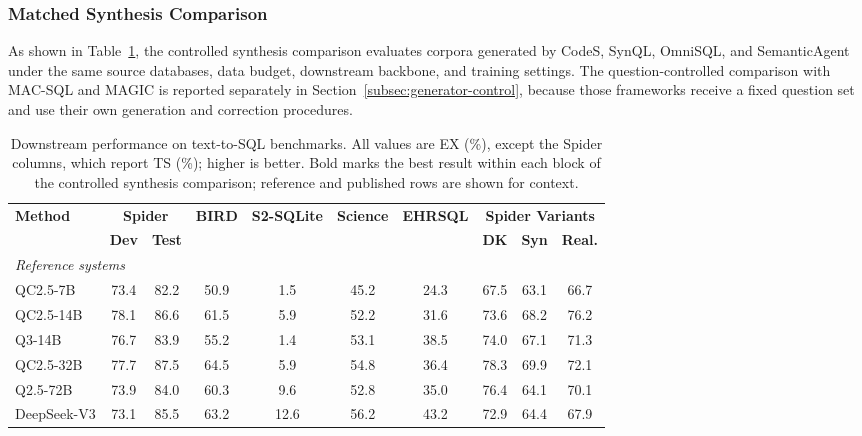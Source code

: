 \documentclass[letterpaper,journal]{IEEEtran}
\begin{document}
\subsubsection{Matched Synthesis Comparison}
\label{subsec:matched-comparison}

As shown in Table~\ref{tab:main_results}, the controlled synthesis comparison evaluates corpora generated by CodeS, SynQL, OmniSQL, and SemanticAgent under the same source databases, data budget, downstream backbone, and training settings. The question-controlled comparison with MAC-SQL and MAGIC is reported separately in Section~\ref{subsec:generator-control}, because those frameworks receive a fixed question set and use their own generation and correction procedures.
\begin{table}[t]
\centering
\caption{Downstream performance on text-to-SQL benchmarks. All values are EX (\%), except the Spider columns, which report TS (\%); higher is better. Bold marks the best result within each block of the controlled synthesis comparison; reference and published rows are shown for context.}
\label{tab:main_results}
\small
\setlength{\tabcolsep}{3pt}
\renewcommand{\arraystretch}{1.05}
\begin{tabular}{@{}lccccccccc@{}}
\toprule
\multirow{2}{*}{\textbf{Method}}
& \multicolumn{2}{c}{\textbf{Spider}}
& \multirow{2}{*}{\textbf{BIRD}}
& \multirow{2}{*}{\textbf{S2-SQLite}}
& \multirow{2}{*}{\textbf{Science}}
& \multirow{2}{*}{\textbf{EHRSQL}}
& \multicolumn{3}{c}{\textbf{Spider Variants}} \\
\cmidrule(lr){2-3} \cmidrule(lr){8-10}
& \textbf{Dev} & \textbf{Test} & & & & & \textbf{DK} & \textbf{Syn} & \textbf{Real.} \\
\midrule
\multicolumn{10}{l}{\emph{Reference systems}} \\
\midrule
QC2.5-7B         & 73.4 & 82.2 & 50.9 & 1.5  & 45.2 & 24.3 & 67.5 & 63.1 & 66.7 \\
QC2.5-14B        & 78.1 & 86.6 & 61.5 & 5.9  & 52.2 & 31.6 & 73.6 & 68.2 & 76.2 \\
Q3-14B           & 76.7 & 83.9 & 55.2 & 1.4  & 53.1 & 38.5 & 74.0 & 67.1 & 71.3 \\
QC2.5-32B        & 77.7 & 87.5 & 64.5 & 5.9  & 54.8 & 36.4 & 78.3 & 69.9 & 72.1 \\
Q2.5-72B         & 73.9 & 84.0 & 60.3 & 9.6  & 52.8 & 35.0 & 76.4 & 64.1 & 70.1 \\
DeepSeek-V3      & 73.1 & 85.5 & 63.2 & 12.6 & 56.2 & 43.2 & 72.9 & 64.4 & 67.9 \\

\end{tabular}
\end{table}
\end{document}
